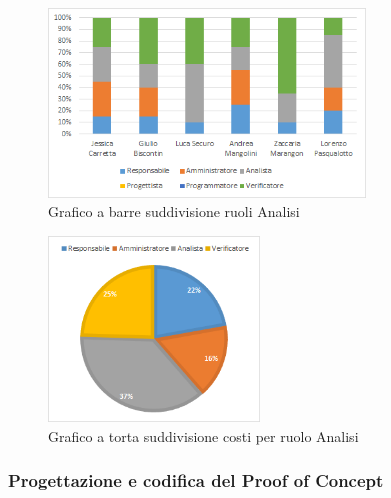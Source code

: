 \begin{figure}[H]
    \centering
    \includegraphics[width=0.75\textwidth]{images/grafico_analisi.png}
    \caption{Grafico a barre suddivisione ruoli Analisi}
    \label{fig:grafico_analisi}
\end{figure}

\begin{figure}[H]
    \centering
    \includegraphics[width=0.5\textwidth]{images/torta_analisi.png}
    \caption{Grafico a torta suddivisione costi per ruolo Analisi}
    \label{fig:torta_analisi}
\end{figure}


\newpage
\subsubsection{Progettazione e codifica del Proof of Concept}\label{sec:preventivo:periodi:progRTB}

